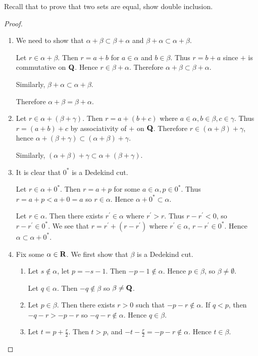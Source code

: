 \begin{remark}
Recall that to prove that two sets are equal, show double inclusion.
\end{remark}

\begin{proof} \
\begin{enumerate}[label=(\roman*)]
\item We need to show that $\alpha+\beta\subset\beta+\alpha$ and $\beta+\alpha\subset\alpha+\beta$.

Let $r\in\alpha+\beta$. Then $r=a+b$ for $a\in\alpha$ and $b\in\beta$. Thus $r=b+a$ since $+$ is commutative on $\mathbf Q$. Hence $r\in\beta+\alpha$. Therefore $\alpha+\beta\subset\beta+\alpha$.

Similarly, $\beta+\alpha\subset\alpha+\beta$.

Therefore $\alpha+\beta=\beta+\alpha$.

\item Let $r\in\alpha+(\beta+\gamma)$. Then $r=a+(b+c)$ where $a\in\alpha,b\in\beta,c\in\gamma$. Thus $r=(a+b)+c$ by associativity of $+$ on $\mathbf Q$. Therefore $r\in(\alpha+\beta)+\gamma$, hence $\alpha+(\beta+\gamma)\subset(\alpha+\beta)+\gamma$.

Similarly, $(\alpha+\beta)+\gamma\subset\alpha+(\beta+\gamma)$.

\item It is clear that $0^*$ is a Dedekind cut.

Let $r\in\alpha+0^*$. Then $r=a+p$ for some $a\in\alpha,p\in0^*$. Thus $r=a+p<a+0=a$ so $r\in\alpha$. Hence $\alpha+0^*\subset\alpha$.

Let $r\in\alpha$. Then there exists $r^\prime\in\alpha$ where $r^\prime>r$. Thus $r-r^\prime<0$, so $r-r^\prime\in0^*$. We see that $r=r^\prime+(r-r^\prime)$ where $r^\prime\in\alpha$, $r-r^\prime\in0^*$. Hence $\alpha\subset\alpha+0^*$.

\item Fix some $\alpha\in\mathbf R$. We first show that $\beta$ is a Dedekind cut.
\begin{enumerate}[label=(\roman*)]
\item Let $s\notin\alpha$, let $p=-s-1$. Then $-p-1\notin\alpha$. Hence $p\in\beta$, so $\beta\neq\emptyset$.

Let $q\in\alpha$. Then $-q\notin\beta$ so $\beta\neq\mathbf Q$.

\item Let $p\in\beta$. Then there exists $r>0$ such that $-p-r\notin\alpha$. If $q<p$, then $-q-r>-p-r$ so $-q-r\notin\alpha$. Hence $q\in\beta$.
\item Let $t=p+\frac{r}{2}$. Then $t>p$, and $-t-\frac{r}{2}=-p-r\notin\alpha$. Hence $t\in\beta$.
\end{enumerate}


\end{enumerate}
\end{proof}

